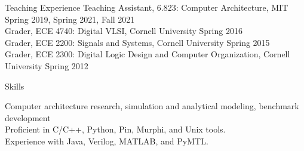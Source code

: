\documentclass{resume} %
\begin{document}

\begin{rSection}{Teaching Experience}
Teaching Assistant, 6.823: Computer Architecture, MIT \hfill {Spring 2019, Spring 2021, Fall 2021} \\
Grader, ECE 4740: Digital VLSI, Cornell University \hfill {Spring 2016} \\
Grader, ECE 2200: Signals and Systems, Cornell University \hfill {Spring 2015} \\
Grader, ECE 2300: Digital Logic Design and Computer Organization, Cornell University \hfill{Spring 2012}

\end{rSection}


\begin{rSection}{Skills}

Computer architecture research, simulation and analytical modeling, benchmark development \\
Proficient in C/C++, Python, Pin, Murphi, and Unix tools. \\
Experience with Java, Verilog, MATLAB, and PyMTL.

\end{rSection}






\end{document}
